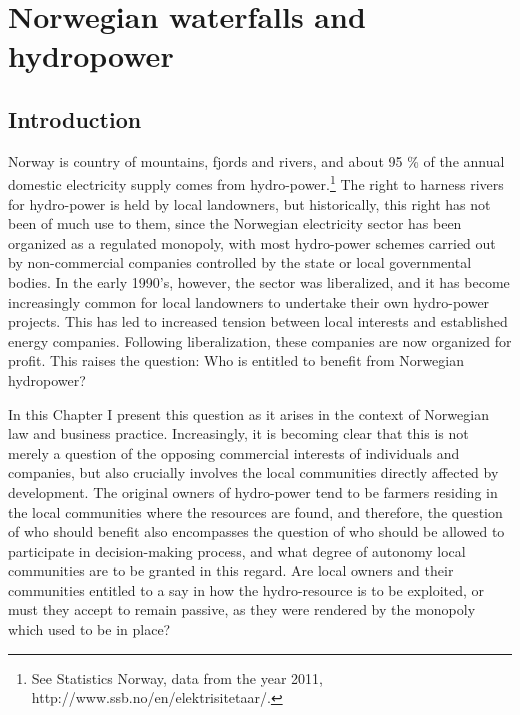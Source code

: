 \chapter{Norwegian waterfalls and hydropower}\label{chap:3}

\section{Introduction}\label{sec:into3}

Norway is country of mountains, fjords and rivers, and about 95 \% of the annual domestic electricity supply comes from hydro-power.\footnote{See Statistics Norway, data from the year 2011, http://www.ssb.no/en/elektrisitetaar/.} The right to harness rivers for hydro-power is held by local landowners, but historically, this right has not been of much use to them, since the Norwegian electricity sector has been organized as a regulated monopoly, with most hydro-power schemes carried out by non-commercial companies controlled by the state or local governmental bodies. In the early 1990's, however, the sector was liberalized, and it has become increasingly common for local landowners to undertake their own hydro-power projects. This has led to increased tension between local interests and established energy companies. Following liberalization, these companies are now organized for profit. This raises the question: Who is entitled to benefit from Norwegian hydropower?

In this Chapter I present this question as it arises in the context of Norwegian law and business practice. Increasingly, it is becoming clear that this is not merely a question of the opposing commercial interests of individuals and companies, but also crucially involves the local communities directly affected by development. The original owners of hydro-power tend to be farmers residing in the local communities where the resources are found, and therefore, the question of who should benefit also encompasses the question of who should be allowed to participate in decision-making process, and what degree of autonomy local communities are to be granted in this regard. Are local owners and their communities entitled to a say in how the hydro-resource is to be exploited, or must they accept to remain passive, as they were rendered by the monopoly which used to be in place?

